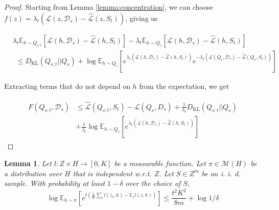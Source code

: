\documentclass{article}
\theoremstyle{plain}
\newtheorem{lemma}[theorem]{Lemma}
\theoremstyle{definition}
\theoremstyle{remark}
\begin{document}
\begin{proof}
    Starting from Lemma \ref{lemma:concentration}, we can choose $f(z)=\lambda_t(\mathcal{L}(z,\mathcal{D}_s)-\hat{\mathcal{L}}(z,S_t))$, giving us

\begin{align*}
&\lambda_t\mathbb{E}_{h\sim Q_{s:t}}\left [\mathcal{L}(h,\mathcal{D}_s)-\hat{\mathcal{L}}(h,S_t) \right ] - \lambda_t\mathbb{E}_{h\sim Q_{s}}\left [\mathcal{L}(h,\mathcal{D}_s)-\hat{\mathcal{L}}(h,S_t) \right ] \\
&~~\leq D_{\mathrm{KL}}(Q_{s:t}||Q_{s})+\log\mathbb{E}_{h\sim Q_{s}}\left [e^{\lambda_t(\mathcal{L}(h,\mathcal{D}_s)-\hat{\mathcal{L}}(h,S_t))}e^{-\lambda_t(\mathcal{L}(Q_s,\mathcal{D}_s)-\hat{\mathcal{L}}(Q_s,S_t))} \right ]
\end{align*}

Extracting terms that do not depend on $h$ from the expectation, we get

\begin{align} \label{eq:forget-base}
\begin{split}
F(Q_{s:t},\mathcal{D}_s) &\leq \hat{\mathcal{L}}(Q_{s:t}, S_t) - \mathcal{L}(Q_{s}, D_s) + \frac{1}{\lambda_t} D_{\mathrm{KL}}(Q_{s:t}||Q_{s})\\
&+\frac{1}{\lambda_t}\log\mathbb{E}_{h\sim Q_{s}}\left [e^{\lambda_t(\mathcal{L}(h,\mathcal{D}_s)-\hat{\mathcal{L}}(h,S_t))} \right ]
\end{split}
\end{align}

\end{proof}

\begin{lemma} \label{lemma:hoeffding-concentration}
	Let $l:Z\times H\rightarrow[0,K]$ be a measurable function. Let $\pi\in\mathcal{M}(H)$ be a distribution over $H$ that is independent w.r.t. $Z$. Let $S\in Z^m$ be an i.\! i.\! d.\! sample. With probability at least $1-\delta$ over the choice of $S$,
%	
	$$\log \mathbb{E}_{h\sim \pi}\left [e^{t(\frac{1}{m}\sum_i l(z_i,h)-\mathbb{E}_{z}l(z,h))}\right ]\leq \frac{t^2K^2}{8m}+\log{1/ \delta}$$
\end{lemma}
\end{document}
